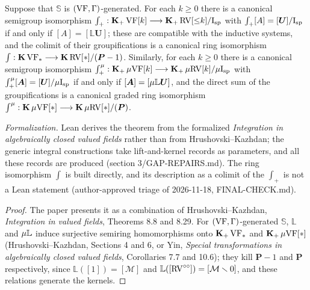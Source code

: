 \setcounter{theorem}{21}
\begin{theorem}
\label{main-prop-HK}
\leanok
{}
Suppose that $\mathbb{S}$ is $(\mathrm{VF}, \Gamma)$-generated. For each $k \geq 0$ there is a canonical semigroup isomorphism $\int_{+} : \operatorname{\mathbf{K}_+} \mathrm{VF}[k] \longrightarrow \operatorname{\mathbf{K}_+} \mathrm{RV}[{\leq}k] / \mathrm{I}_{\mathrm{sp}}$ with $\int_{+} [A] = [\boldsymbol{U}] / \mathrm{I}_{\mathrm{sp}}$ if and only if $[A] = [\mathbb{L} \boldsymbol{U}]$; these are compatible with the inductive systems, and the colimit of their groupifications is a canonical ring isomorphism $\int : \operatorname{\mathbf{K}} \mathrm{VF}_* \longrightarrow \operatorname{\mathbf{K}} \mathrm{RV}[*] / (\boldsymbol{P} - 1)$. Similarly, for each $k \geq 0$ there is a canonical semigroup isomorphism $\int_{+}^{\mu} : \operatorname{\mathbf{K}_+} \mu\mathrm{VF}[k] \longrightarrow \operatorname{\mathbf{K}_+} \mu\mathrm{RV}[k] / \mu\mathrm{I}_{\mathrm{sp}}$ with $\int_{+}^{\mu} [\boldsymbol{A}] = [\boldsymbol{U}] / \mu\mathrm{I}_{\mathrm{sp}}$ if and only if $[\boldsymbol{A}] = [\mu\mathbb{L} \boldsymbol{U}]$, and the direct sum of the groupifications is a canonical graded ring isomorphism $\int^{\mu} : \operatorname{\mathbf{K}} \mu\mathrm{VF}[*] \longrightarrow \operatorname{\mathbf{K}} \mu\mathrm{RV}[*] / (\boldsymbol{P})$.

\emph{Formalization.} Lean derives the theorem from the formalized \emph{Integration in algebraically closed valued fields} rather than from Hrushovski--Kazhdan; the generic integral constructions take lift-and-kernel records as parameters, and all these records are produced (section 3/GAP-REPAIRS.md). The ring isomorphism $\int$ is built directly, and its description as a colimit of the $\int_{+}$ is not a Lean statement (author-approved triage of 2026-11-18, FINAL-CHECK.md).
\end{theorem}

\begin{proof}
\leanok
The paper presents it as a combination of Hrushovski--Kazhdan, \emph{Integration in valued fields}, Theorems 8.8 and 8.29. For $(\mathrm{VF}, \Gamma)$-generated $\mathbb{S}$, $\mathbb{L}$ and $\mu\mathbb{L}$ induce surjective semiring homomorphisms onto $\operatorname{\mathbf{K}_+} \mathrm{VF}_*$ and $\operatorname{\mathbf{K}_+} \mu\mathrm{VF}[*]$ (Hrushovski--Kazhdan, Sections 4 and 6, or Yin, \emph{Special transformations in algebraically closed valued fields}, Corollaries 7.7 and 10.6); they kill $\boldsymbol{P} - 1$ and $\boldsymbol{P}$ respectively, since $\mathbb{L}([1]) = [\mathcal{M}]$ and $\mathbb{L}([\mathrm{RV}^{\circ\circ}]) = [\mathcal{M} \smallsetminus 0]$, and these relations generate the kernels.
\end{proof}

